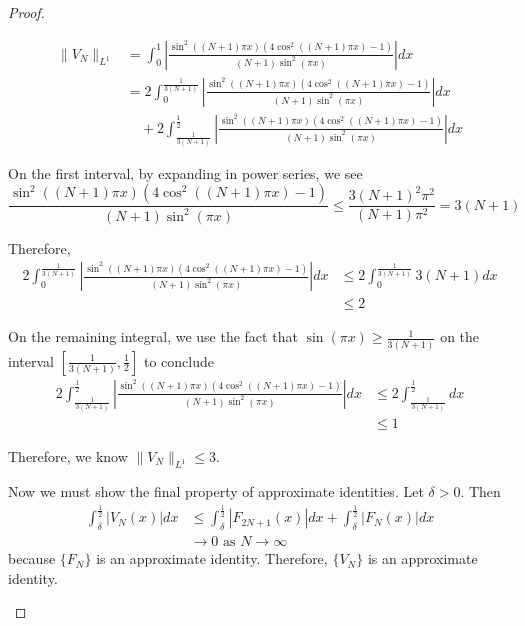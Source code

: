 \documentclass[a4paper]{article}
\begin{document}
\begin{enumerate}
\begin{proof}
\begin{enumerate}
    \begin{align*}
      \| V_N \|_{L^1} &= \int_{0}^{1} \left| \frac{\sin^2 \left( (N+1) \pi x \right) \left( 4 \cos^2 \left( (N+1) \pi x \right) - 1 \right)}{(N+1)
      \sin^2 (\pi x)} \right| dx \\
      &= 2 \int_{0}^{\frac{1}{3(N+1)}} \left| \frac{\sin^2 \left( (N+1) \pi x \right) \left( 4 \cos^2 \left( (N+1) \pi x \right) - 1 \right)}{(N+1)
      \sin^2 (\pi x)} \right| dx \\
      &\quad + 2 \int_{\frac{1}{3(N+1)}}^{\frac{1}{2}} \left| \frac{\sin^2 \left( (N+1) \pi x \right) \left( 4 \cos^2 \left( (N+1) \pi x \right) - 1 \right)}{(N+1)
      \sin^2 (\pi x)} \right| dx
    \end{align*}

    On the first interval, by expanding in power series, we see
    \[ \frac{\sin^2 \left( (N+1) \pi x \right) \left( 4 \cos^2 \left( (N+1) \pi x \right) - 1 \right)}{(N+1)
    \sin^2 (\pi x)} \leq \frac{3(N+1)^2 \pi^2}{(N+1) \pi^2} = 3(N+1) \]

    Therefore,
    \begin{align*}
      2 \int_{0}^{\frac{1}{3(N+1)}} \left| \frac{\sin^2 \left( (N+1) \pi x \right) \left( 4 \cos^2 \left( (N+1) \pi x \right) - 1 \right)}{(N+1)
      \sin^2 (\pi x)} \right| dx &\leq 2 \int_{0}^{\frac{1}{3(N+1)}} 3(N+1) dx \\
      & \leq 2
    \end{align*}

    On the remaining integral, we use the fact that $\sin( \pi x ) \geq \frac{1}{3(N+1)}$ on the interval $[\frac{1}{3(N+1)}, \frac{1}{2} ]$ to
    conclude
    \begin{align*}
      2 \int_{\frac{1}{3(N+1)}}^{\frac{1}{2}} \left| \frac{\sin^2 \left( (N+1) \pi x \right) \left( 4 \cos^2 \left( (N+1) \pi x \right) - 1 \right)}{(N+1)
      \sin^2 (\pi x)} \right| dx &\leq 2 \int_{\frac{1}{3(N+1)}}^{\frac{1}{2}} dx \\
      &\leq 1
    \end{align*}

    Therefore, we know $\| V_N \|_{L^1} \leq 3$.

    Now we must show the final property of approximate identities. Let $\delta > 0$. Then
    \begin{align*}
      \int_{\delta}^{\frac{1}{2}} \left| V_N(x) \right| dx &\leq \int_{\delta}^{\frac{1}{2}} \left| F_{2N+1}(x) \right| dx +
      \int_{\delta}^{\frac{1}{2}} \left| F_N(x) \right| dx \\
      &\to 0 \text{ as } N \to \infty
    \end{align*}
    because $\{F_N\}$ is an approximate identity.
    Therefore, $\{V_N\}$ is an approximate identity.


\end{enumerate}
\end{proof}
\end{enumerate}
\end{document}

